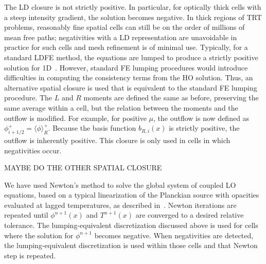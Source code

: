 \documentclass{mc2013}
\newcommand{\mom}[1]{\langle #1 \rangle}
\begin{document}
The LD closure is not strictly positive.  In particular, for
optically thick cells with a steep intensity gradient, the solution becomes negative.  In thick regions of
TRT problems, reasonably fine spatial cells can still be on the order of millions of mean
free paths; negativities with a LD representation are unavoidable in practice for
such cells and mesh refinement is of minimal use.  Typically, for a standard LDFE method,
the equations are lumped to produce a strictly positive solution for 1D~\cite{morel_newton}. However, standard FE lumping
procedures would introduce difficulties in computing the consistency terms from the
HO solution.  Thus, an alternative spatial closure is used that is equivalent to the
standard FE lumping procedure.  The $L$ and $R$ moments are defined the same as before,
preserving the same average within a cell, but the relation between the moments and
the outflow is modified.   For example, for positive $\mu$,
the outflow is now defined as $\phi^+_{i+1/2} = \mom{\phi}_R^+.$  Because the basis function $b_{R,i}(x)$ is strictly
positive, the outflow is inherently positive.  This closure is only used
in cells in which negativities occur.

MAYBE DO THE OTHER SPATIAL CLOSURE


We have used Newton's method to solve the global system of coupled LO
equations, based on a typical linearization of the Planckian source with opacities
evaluated at lagged temperatures, as described in~\cite{morel_newton}.  
Newton iterations are repeated until $\phi^{n+1}(x)$ and $T^{n+1}(x)$ are converged
to a desired relative tolerance.  The lumping-equivalent discretization
discussed above is used for cells where the solution for
$\phi^{n+1}$ becomes negative. When negativities are detected, the lumping-equivalent discretization is used within
those cells and that Newton step is repeated. 
\end{document}
